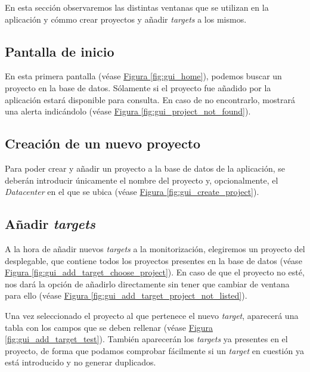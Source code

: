 En esta sección observaremos las distintas ventanas que se utilizan en la aplicación y cómmo crear proyectos y añadir	\textit{targets} a los mismos.

\subsection*{Pantalla de inicio}
\label{sec:gui_home}
En esta primera pantalla (véase \hyperref[fig:gui_home]{Figura \ref{fig:gui_home}}), podemos buscar un proyecto en la base de datos. Sólamente si el proyecto fue añadido por la aplicación estará disponible para consulta. En caso de no encontrarlo, mostrará una alerta indicándolo (véase \hyperref[fig:gui_project_not_found]{Figura \ref{fig:gui_project_not_found}}).

\subsection*{Creación de un nuevo proyecto}
\label{sec:gui_create_project}
Para poder crear y añadir un proyecto a la base de datos de la aplicación, se deberán introducir únicamente el nombre del proyecto y, opcionalmente, el \textit{Datacenter} en el que se ubica (véase \hyperref[fig:gui_create_project]{Figura \ref{fig:gui_create_project}}).

\subsection*{Añadir	\textit{targets}}
\label{sec:gui_add_target}
A la hora de añadir nuevos \textit{targets} a la monitorización, elegiremos un proyecto del desplegable, que contiene todos los proyectos presentes en la base de datos (véase \hyperref[fig:gui_add_target_choose_project]{Figura \ref{fig:gui_add_target_choose_project}}). En caso de que el proyecto no esté, nos dará la opción de añadirlo directamente sin tener que cambiar de ventana para ello (véase \hyperref[fig:gui_add_target_project_not_listed]{Figura \ref{fig:gui_add_target_project_not_listed}}).

Una vez seleccionado el proyecto al que pertenece el nuevo \textit{target}, aparecerá una tabla con los campos que se deben rellenar (véase \hyperref[fig:gui_add_target_test]{Figura \ref{fig:gui_add_target_test}}). También aparecerán los \textit{targets} ya presentes en el proyecto, de forma que podamos comprobar fácilmente si un \textit{target} en cuestión ya está introducido y no generar duplicados.